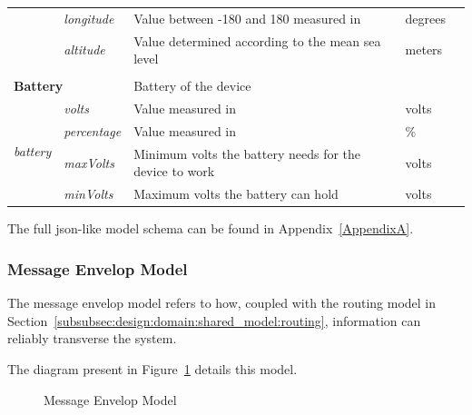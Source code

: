 \begin{landscape}
\begin{longtable}{cllll}
                                         & \textit{longitude}                 & Value between -180 and 180 measured in                 & degrees                        &  \\
                                         & \textit{altitude}                  & Value determined according to the mean sea level       & meters                         &  \\ [0.4em] \cline{1-4}
   \\[-0.85em]
   \multicolumn{2}{l}{\textbf{Battery}}                                       & \multicolumn{2}{l}{Battery of the device}                                               &  \\
   \multirow{4}{*}{\textit{battery}}     & \textit{volts}                     & Value measured in                                      & volts                          &  \\
                                         & \textit{percentage}                & Value measured in                                      & \%                             &  \\
                                         & \textit{maxVolts}                  & Minimum volts the battery needs for the device to work & volts                          &  \\
                                         & \textit{minVolts}                  & Maximum volts the battery can hold                     & volts                          &  \\ [0.4em] \cline{1-4}
   \end{longtable}
\end{landscape}

The full json-like model schema can be found in Appendix~\ref{AppendixA}.

\subsubsection{Message Envelop Model}
\label{subsubsec:design:domain:shared_model:message}

The message envelop model refers to how, coupled with the routing model in Section~\ref{subsubsec:design:domain:shared_model:routing}, information can reliably transverse the system.

The diagram present in Figure~\ref{fig:design:domain:shared_model:messsage:diagram} details this model.

\begin{figure}[H]
   \centering
  \resizebox{\columnwidth}{!}
  {
     
  }
  \caption[Message Envelop Model]{Message Envelop Model}
  \label{fig:design:domain:shared_model:messsage:diagram}
\end{figure}

